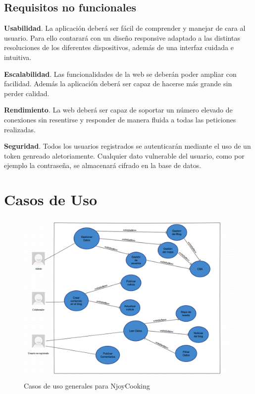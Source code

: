 \subsection{Requisitos no funcionales}

\textbf{Usabilidad}. La aplicación deberá ser fácil de comprender y manejar de cara al usuario. Para ello contarará con un diseño responsive adaptado a las distintas resoluciones de  los diferentes dispositivos, además de una interfaz cuidada e intuitiva.

\vspace{5mm}

\textbf{Escalabilidad}. Las funcionalidades de la web se deberán poder ampliar con facilidad. Además la aplicación deberá ser capaz de hacerse más grande sin perder calidad.

\vspace{5mm}

\textbf{Rendimiento}. La web deberá ser capaz de soportar un número elevado de conexiones sin resentirse y responder de manera fluida a todas las peticiones realizadas.

\vspace{5mm}

\textbf{Seguridad}. Todos los usuarios registrados se autenticarán mediante el uso de un token genreado aletoriamente. Cualquier dato vulnerable del usuario, como por ejemplo la contraseña, se almacenará cifrado en la base de datos.

\section{Casos de Uso}

\begin{landscape}
\begin{figure}
\begin{center}
\includegraphics[width=16cm]{imagenes/casos-de-uso.png}
\caption{Casos de uso generales para NjoyCooking}
\label{casos_uso}
\end{center}
\end{figure}
\end{landscape}

